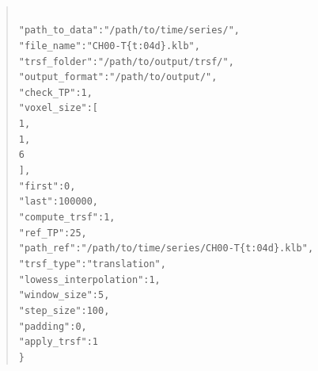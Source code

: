 \documentclass[10pt,a4paper]{article}
\newcommand\tab[1][.6cm]{\hspace*{#1}}
\newenvironment{code}[1]{\mbox{}\\[1ex]\hspace*{-#1cm}\begin{minipage}{150mm}\begin{quote}\tt}{\end{quote}\end{minipage}\mbox{}\\[1ex]}
\begin{document}
\begin{code}{0.8}
\{\\
\tab"path\_to\_data":"/path/to/time/series/",\\
\tab"file\_name":"CH00-T\{t:04d\}.klb",\\
\tab"trsf\_folder":"/path/to/output/trsf/",\\
\tab"output\_format":"/path/to/output/",\\
\tab"check\_TP":1,\\
\tab"voxel\_size":[\\
\tab\tab1,\\
\tab\tab1,\\
\tab\tab6\\
\tab],\\
\tab"first":0,\\
\tab"last":100000,\\
\tab"compute\_trsf":1,\\
\tab"ref\_TP":25,\\
\tab"path\_ref":"/path/to/time/series/CH00-T\{t:04d\}.klb",\\
\tab"trsf\_type":"translation",\\
\tab"lowess\_interpolation":1,\\
\tab"window\_size":5,\\
\tab"step\_size":100,\\
\tab"padding":0,\\
\tab"apply\_trsf":1\\
\}
\end{code}
\end{document}

